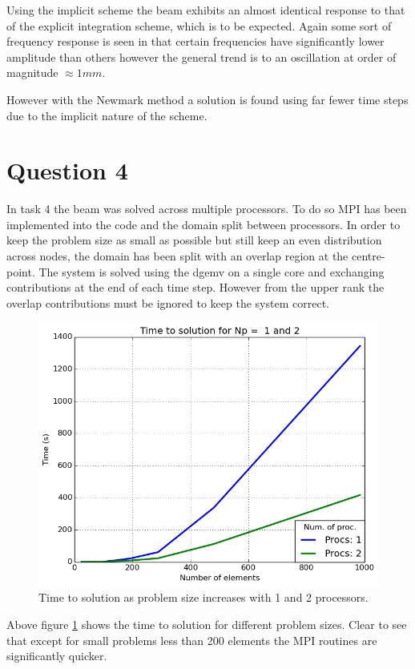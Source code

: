 \documentclass[10pt, a4paper]{article}
\begin{document}
Using the implicit scheme the beam exhibits an almost identical response to that of the explicit integration scheme, which is to be expected. Again some sort of frequency response is seen in that certain frequencies have significantly lower amplitude than others however the general trend is to an oscillation at order of magnitude $\approx 1mm$.

However with the Newmark method a solution is found using far fewer time steps due to the implicit nature of the scheme.

\section*{Question 4}

In task 4 the beam was solved across multiple processors. To do so MPI has been implemented into the code and the domain split between processors. In order to keep the problem size as small as possible but still keep an even distribution across nodes, the domain has been split with an overlap region at the centre-point. The system is solved using the dgemv on a single core and exchanging contributions at the end of each time step. However from the upper rank the overlap contributions must be ignored to keep the system correct.

\begin{figure}[!htb]
  \centering
	  \includegraphics[width=.5\linewidth, clip=true, trim=0cm 0cm 0cm 0cm]{task4_timing}
  \caption{Time to solution as problem size increases with 1 and 2 processors.}
  \label{fig:timing4}
\end{figure}%

Above figure \ref{fig:timing4} shows the time to solution for different problem sizes. Clear to see that except for small problems less than 200 elements the MPI routines are significantly quicker.
\end{document}
